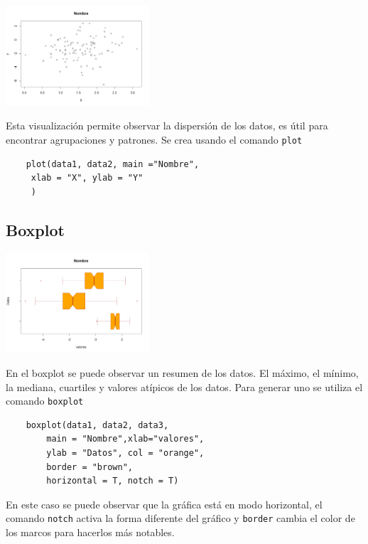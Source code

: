 \documentclass[twoside,twocolumn]{article}
\begin{document}
\begin{center}
    \includegraphics[width=0.4\textwidth]{images/scatter.png}
\end{center}

Esta visualización permite observar la dispersión de los datos, es útil para encontrar agrupaciones y patrones. Se crea usando el comando \verb|plot|

\begin{verbatim}
    plot(data1, data2, main ="Nombre",
     xlab = "X", ylab = "Y"
     )
\end{verbatim}

\subsection{Boxplot}

\begin{center}
    \includegraphics[width=0.4\textwidth]{images/boxplot.png}
\end{center}

En el boxplot se puede observar un resumen de los datos. El máximo, el mínimo, la mediana, cuartiles y valores atípicos de los datos. Para generar uno se utiliza el comando \verb|boxplot|

\begin{verbatim}
    boxplot(data1, data2, data3, 
        main = "Nombre",xlab="valores",
        ylab = "Datos", col = "orange",
        border = "brown",
        horizontal = T, notch = T)
\end{verbatim}

En este caso se puede observar que la gráfica está en modo horizontal, el comando \verb|notch| activa la forma diferente del gráfico y \verb|border| cambia el color de los marcos para hacerlos más notables.
\end{document}
